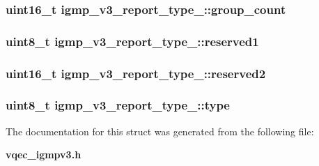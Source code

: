 \subsubsection{\setlength{\rightskip}{0pt plus 5cm}uint16\_\-t \bf{igmp\_\-v3\_\-report\_\-type\_\-::group\_\-count}}\label{structigmp__v3__report__type___8be80199c334e8df64f76ed1e686e698}


\subsubsection{\setlength{\rightskip}{0pt plus 5cm}uint8\_\-t \bf{igmp\_\-v3\_\-report\_\-type\_\-::reserved1}}\label{structigmp__v3__report__type___5fa65a1299cde8d2f210e9bb75f7b639}


\subsubsection{\setlength{\rightskip}{0pt plus 5cm}uint16\_\-t \bf{igmp\_\-v3\_\-report\_\-type\_\-::reserved2}}\label{structigmp__v3__report__type___ed0c83b936b0718a73222b66dabc6ade}


\subsubsection{\setlength{\rightskip}{0pt plus 5cm}uint8\_\-t \bf{igmp\_\-v3\_\-report\_\-type\_\-::type}}\label{structigmp__v3__report__type___b3bf4f1e7d17d00d9ccbccb6bd30c52e}




The documentation for this struct was generated from the following file:\begin{CompactItemize}
\item 
\bf{vqec\_\-igmpv3.h}\end{CompactItemize}

